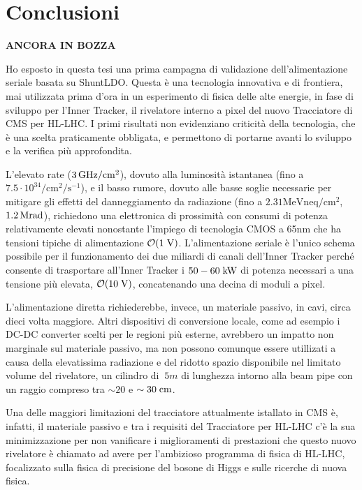 \chapter{Conclusioni}

{\huge\bf ANCORA IN BOZZA}

Ho esposto in questa tesi una prima campagna di validazione dell'alimentazione seriale basata su ShuntLDO. Questa \`e una tecnologia innovativa e di frontiera, mai utilizzata prima d'ora in un esperimento di fisica delle alte energie, in fase di sviluppo per l'Inner Tracker, il rivelatore interno a pixel del nuovo Tracciatore di CMS per HL-LHC. I primi risultati non evidenziano criticit\`a della tecnologia, che \`e una scelta praticamente obbligata, e permettono di portarne avanti lo sviluppo e la verifica pi\`u approfondita.

L'elevato rate ($3{\rm \, GHz}/\mathrm{cm^2}$), dovuto alla luminosit\`a istantanea (fino a $\mathrm{7.5\cdot 10^{34}/cm^2/s^{-1}}$), e il basso rumore, dovuto alle basse soglie necessarie per mitigare gli effetti del danneggiamento da radiazione (fino a $2.3\mathrm{1MeV neq/cm^2}$, $1.2{\rm \, Mrad}$), richiedono una elettronica di prossimit\`a con consumi di potenza relativamente elevati nonostante l'impiego di tecnologia CMOS a 65nm che ha tensioni tipiche di alimentazione ${\cal O}(1\rm \; V)$. L'alimentazione seriale \`e l'unico schema possibile per il funzionamento dei due miliardi di canali dell'Inner Tracker perch\'e consente di trasportare all'Inner Tracker i $50-60\rm \; kW$ di potenza necessari a una tensione pi\`u elevata, ${\cal O}(10\rm \; V)$, concatenando una decina di moduli a pixel.


L'alimentazione diretta richiederebbe, invece, un materiale passivo, in cavi, circa dieci volta maggiore. Altri dispositivi di conversione locale, come ad esempio i DC-DC converter scelti per le regioni pi\`u esterne, avrebbero un impatto non marginale sul materiale passivo, ma non possono comunque essere utillizati a causa della elevatissima radiazione e del ridotto spazio disponibile nel limitato volume del rivelatore, un cilindro di $~5m$ di lunghezza intorno alla beam pipe con un raggio compreso tra $\sim20$ e $\sim 30\rm \; cm$.

Una delle maggiori limitazioni del tracciatore attualmente istallato in CMS \`e, infatti, il materiale passivo e tra i requisiti del Tracciatore per HL-LHC c'\`e la sua minimizzazione per non vanificare i miglioramenti di prestazioni che questo nuovo rivelatore \`e chiamato ad avere per l'ambizioso programma di fisica di HL-LHC, focalizzato sulla fisica di precisione del bosone di Higgs e sulle ricerche di nuova fisica. 

